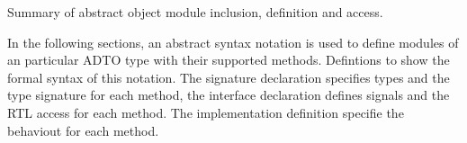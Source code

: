 \documentclass[a4paper,12pt,twoside,english]{article}
\begin{document}
\begin{table}[H]
\begin{center}
{%
}
\end{center}

\caption{Summary of abstract object module inclusion, definition and access.
}
\label{table:21}
\end{table}

\def\thesubsubsection{\vrule width 0pt height 1.3 ex}

\def\thesubsection{\tocXLI}
\secII{\label{toclabelXLI}\thesubsection}
In the following sections, an abstract syntax notation is used to define modules of an particular ADTO
type with their supported methods. Defintions  to  show the formal syntax of this notation. The signature declaration specifies
types and the type signature for each method, the interface declaration defines signals and the RTL access for each method. The implementation definition
specifie the behaviout for each method.
\end{document}
